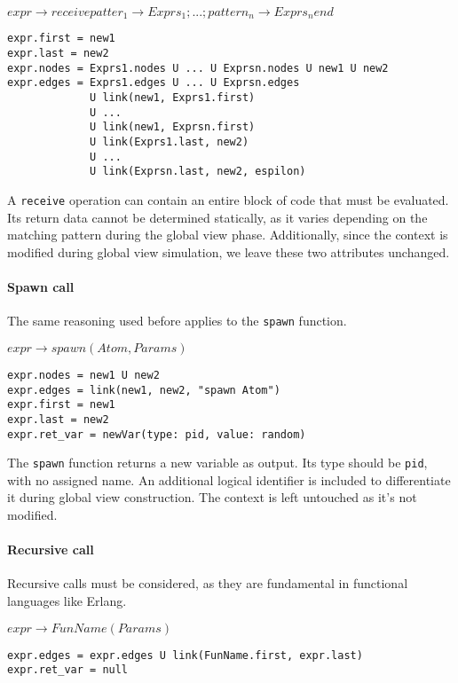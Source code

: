 \bigskip

\noindent $expr \to receive patter_1 \to Exprs_1; ...; pattern_n \to Exprs_n end$

\begin{verbatim}
expr.first = new1
expr.last = new2
expr.nodes = Exprs1.nodes U ... U Exprsn.nodes U new1 U new2
expr.edges = Exprs1.edges U ... U Exprsn.edges
             U link(new1, Exprs1.first) 
             U ...
             U link(new1, Exprsn.first)
             U link(Exprs1.last, new2)
             U ...
             U link(Exprsn.last, new2, espilon)
\end{verbatim}

A \texttt{receive} operation can contain an entire block of code 
that must be evaluated.  
Its return data cannot be determined statically, as it varies depending  
on the matching pattern during the global view phase. Additionally,  
since the context is modified during global view simulation,  
we leave these two attributes unchanged.  

\paragraph{Spawn call}  
The same reasoning used before applies to the \texttt{spawn} function.  

\bigskip

\noindent $expr \to spawn(Atom, Params)$

\begin{verbatim}
expr.nodes = new1 U new2
expr.edges = link(new1, new2, "spawn Atom")
expr.first = new1
expr.last = new2
expr.ret_var = newVar(type: pid, value: random) 
\end{verbatim}

The \texttt{spawn} function returns a new variable as output.  
Its type should be \texttt{pid}, with no assigned name.  
An additional logical identifier is included to differentiate  
it during global view construction. The context is left untouched
as it's not modified.

\paragraph{Recursive call}  
Recursive calls must be considered, as they are fundamental  
in functional languages like Erlang.  

\bigskip

\noindent $expr \to FunName(Params)$

\begin{verbatim}
expr.edges = expr.edges U link(FunName.first, expr.last)
expr.ret_var = null
\end{verbatim}

